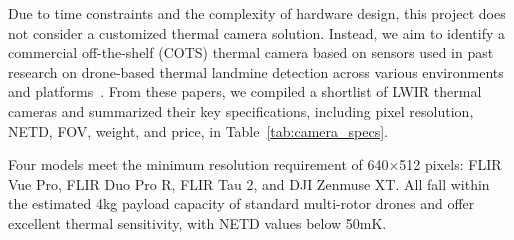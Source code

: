 Due to time constraints and the complexity of hardware design, this project does not consider a customized thermal camera solution. Instead, we aim to identify a commercial off-the-shelf (COTS) thermal camera based on sensors used in past research on drone-based thermal landmine detection across various environments and platforms~\cite{baur2020applying,nikulin2018detection,krause2018diurnal,TENORIOTAMAYO2024105567,FORERORAMIREZ2022104307,rs15040967,dena2020image,Fardoulis2020PROOFHS,butt2024uav,AgrawalChung2024ComparingSL,Popov2022MethodFM,TENORIOTAMAYO2023109443}. From these papers, we compiled a shortlist of LWIR thermal cameras and summarized their key specifications, including pixel resolution, NETD, FOV, weight, and price, in Table~\ref{tab:camera_specs}.

Four models meet the minimum resolution requirement of 640×512 pixels: FLIR Vue Pro, FLIR Duo Pro R, FLIR Tau 2, and DJI Zenmuse XT. All fall within the estimated 4kg payload capacity of standard multi-rotor drones and offer excellent thermal sensitivity, with NETD values below 50mK.

\setcounter{fnstart}{\value{footnote}}

\renewcommand{\arraystretch}{0.9}
\setlength{\tabcolsep}{5pt}   

